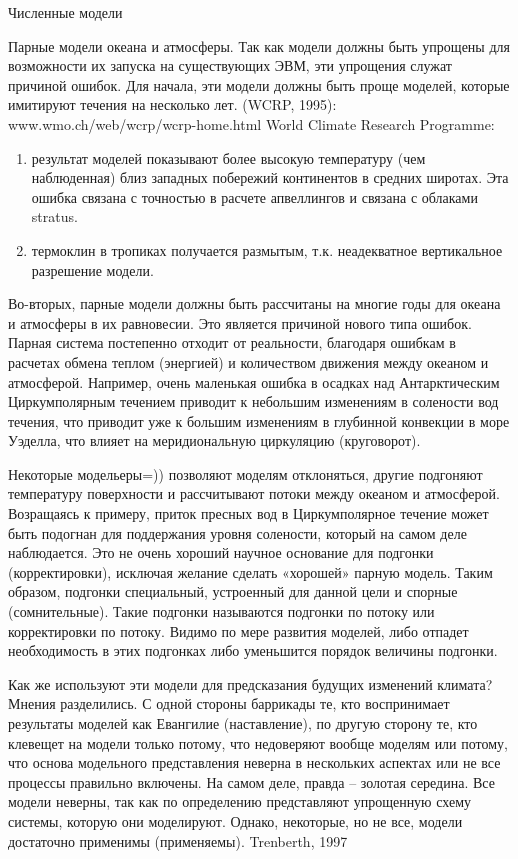 \begin{chapter}{Численные модели}
\begin{section}{Парные модели океана и атмосферы.}
Так как модели должны быть упрощены для возможности их запуска на
существующих ЭВМ, эти упрощения служат причиной ошибок. Для начала,
эти модели должны быть проще моделей, которые имитируют течения на
несколько лет. (WCRP, 1995): www.wmo.ch/web/wcrp/wcrp-home.html World
Climate Research Programme:
\begin{enumerate}
\item
результат моделей показывают более высокую температуру (чем
наблюденная) близ западных побережий континентов в средних
широтах. Эта ошибка связана с точностью в расчете апвеллингов и
связана с облаками stratus.  

\item
термоклин в тропиках получается размытым,
т.к. неадекватное вертикальное разрешение модели.
\end{enumerate}

Во-вторых, парные модели должны быть рассчитаны на многие годы для
океана и атмосферы в их равновесии. Это является причиной нового типа
ошибок. Парная система постепенно отходит от реальности, благодаря
ошибкам в расчетах обмена теплом (энергией) и количеством движения
между океаном и атмосферой. Например, очень маленькая ошибка в осадках
над Антарктическим Циркумполярным течением приводит к небольшим
изменениям в солености вод течения, что приводит уже к большим
изменениям в глубинной конвекции в море Уэделла, что влияет на
меридиональную циркуляцию (круговорот).

Некоторые модельеры=)) позволяют моделям отклоняться, другие подгоняют
температуру поверхности и рассчитывают потоки между океаном и
атмосферой. Возращаясь к примеру, приток пресных вод в Циркумполярное
течение может быть подогнан для поддержания уровня солености, который
на самом деле наблюдается. Это не очень хороший научное основание для
подгонки (корректировки), исключая желание сделать «хорошей» парную
модель. Таким образом, подгонки специальный, устроенный для данной
цели и спорные (сомнительные). Такие подгонки называются подгонки по
потоку или корректировки по потоку. Видимо по мере развития моделей,
либо отпадет необходимость в этих подгонках либо уменьшится порядок
величины подгонки.

Как же используют эти модели для предсказания будущих изменений
климата? Мнения разделились. С одной стороны баррикады те, кто
воспринимает результаты моделей как Евангилие (наставление), по другую
сторону те, кто клевещет на модели только потому, что недоверяют
вообще моделям или потому, что основа модельного представления неверна
в нескольких аспектах или не все процессы правильно включены. На самом
деле, правда – золотая середина. Все модели неверны, так как по
определению представляют упрощенную схему системы, которую они
моделируют. Однако, некоторые, но не все, модели достаточно применимы
(применяемы). Trenberth, 1997


\end{section}
\end{chapter}
